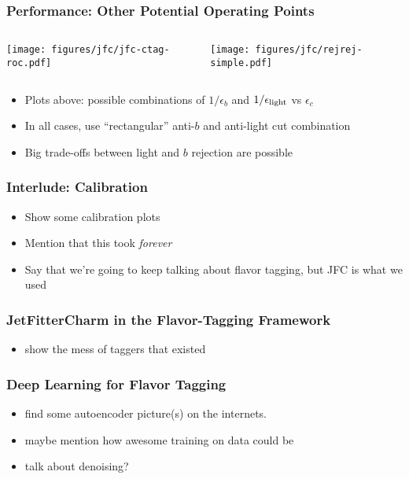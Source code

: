 \documentclass[usenames,dvipsnames]{beamer}
\begin{document}
\begin{frame}
  \frametitle{Performance: Other Potential Operating Points}
  \begin{columns}
    \begin{column}{0.52\textwidth}
      \texttt{[image: figures/jfc/jfc-ctag-roc.pdf]}
    \end{column}
    \begin{column}{0.48\textwidth}
      \texttt{[image: figures/jfc/rejrej-simple.pdf]}
    \end{column}
  \end{columns}
  \begin{itemize}
  \item Plots above: possible combinations of $1/\epsilon_{b}$ and $1/\epsilon_{\rm light}$ vs $\epsilon_c$
  \item In all cases, use ``rectangular'' anti-$b$ and anti-light cut combination
  \item Big trade-offs between light and $b$ rejection are possible
  \end{itemize}
\end{frame}

\begin{frame}
  \frametitle{Interlude: Calibration}
  \begin{itemize}
  \item Show some calibration plots
  \item Mention that this took \emph{forever}
  \item Say that we're going to keep talking about flavor tagging, but JFC is what we used
  \end{itemize}
\end{frame}

\begin{frame}
  \frametitle{JetFitterCharm in the Flavor-Tagging Framework}
  \begin{itemize}
  \item show the mess of taggers that existed
  \end{itemize}
\end{frame}

\begin{frame}
  \frametitle{Deep Learning for Flavor Tagging}
  \begin{itemize}
  \item find some autoencoder picture(s) on the internets.
  \item maybe mention how awesome training on data could be
  \item talk about denoising?
  \end{itemize}
\end{frame}
\end{document}
